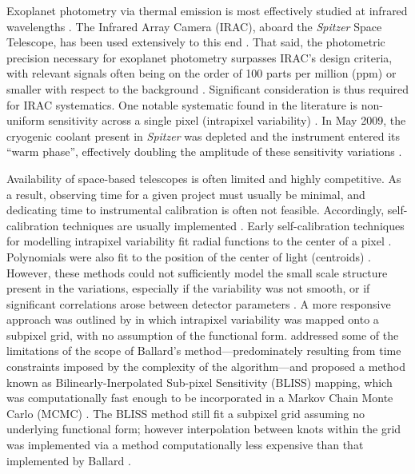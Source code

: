 \documentclass[twocolumn]{aastex61}
\begin{document}
Exoplanet photometry via thermal emission is most effectively studied at infrared wavelengths \citep{ingalls2016}. The Infrared Array Camera (IRAC), aboard the \textit{Spitzer} Space Telescope, has been used extensively to this end \citep[e.g.][]{charbonneau2005,deming2006,knutson2007,desert2009,crossfield2012,lewis2013,todorov2014,evans2015}.
That said, the photometric precision necessary for exoplanet photometry surpasses IRAC's design criteria, with relevant signals often being on the order of 100 parts per million (ppm) or smaller with respect to the background \citep{fazio2004, ingalls2016}. Significant consideration is thus required for IRAC systematics. One notable systematic found in the literature is non-uniform sensitivity across a single pixel (intrapixel variability) \citep{knutson2012}. In May 2009, the cryogenic coolant present in \textit{Spitzer} was depleted and the instrument entered its ``warm phase'', effectively doubling the amplitude of these sensitivity variations \citep{werner2009,ingalls2016}.

Availability of space-based telescopes is often limited and highly competitive. As a result, observing time for a given project must usually be minimal, and dedicating time to instrumental calibration is often not feasible. Accordingly, self-calibration techniques are usually implemented \citep{krick2016}. Early self-calibration techniques for modelling intrapixel variability fit radial functions to the center of a pixel \citep{reach2005}. Polynomials were also fit to the position of the center of light (centroids) \citep{knutson2008}. However, these methods could not sufficiently model the small scale structure present in the variations, especially if the variability was not smooth, or if significant correlations arose between detector parameters \citep{ingalls2016,stevenson2012}. A more responsive approach was outlined by \citet{ballard2010} in which intrapixel variability was mapped onto a subpixel grid, with no assumption of the functional form. \citet{stevenson2012} addressed some of the limitations of the scope of Ballard's method---predominately resulting from time constraints imposed by the complexity of the algorithm---and proposed a method known as Bilinearly-Inerpolated Sub-pixel Sensitivity (BLISS) mapping, which was computationally fast enough to be  incorporated in a Markov Chain Monte Carlo (MCMC) \citep{stevenson2012}. The BLISS method still fit a subpixel grid assuming no underlying functional form; however interpolation between knots within the grid was implemented via a method computationally less expensive than that implemented by Ballard \citep{stevenson2012}.
\end{document}
